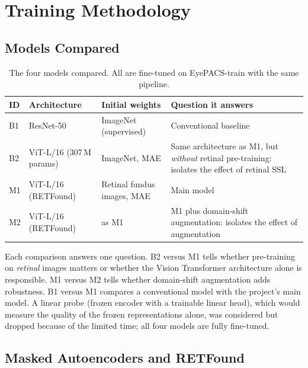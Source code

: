 \section{Training Methodology}
\label{sec:training_methodology}

\subsection{Models Compared}
\label{subsec:models}

\begin{table}[htbp]
    \centering
    \caption{The four models compared. All are fine-tuned on EyePACS-train with the same pipeline.}
    \label{tab:models}
    \begin{tabularx}{\textwidth}{l l l X}
        \toprule
        \textbf{ID} & \textbf{Architecture} & \textbf{Initial weights} & \textbf{Question it answers} \\
        \midrule
        B1 & ResNet-50                & ImageNet (supervised)           & Conventional baseline \\
        B2 & ViT-L/16 (307\,M params) & ImageNet, MAE                   & Same architecture as M1, but \emph{without} retinal pre-training: isolates the effect of retinal SSL \\
        M1 & ViT-L/16 (RETFound)      & Retinal fundus images, MAE      & Main model \\
        M2 & ViT-L/16 (RETFound)      & as M1                           & M1 plus domain-shift augmentation: isolates the effect of augmentation \\
        \bottomrule
    \end{tabularx}
\end{table}

Each comparison answers one question. B2 versus M1 tells whether pre-training on \emph{retinal} images matters or whether the Vision Transformer architecture alone is responsible. M1 versus M2 tells whether domain-shift augmentation adds robustness. B1 versus M1 compares a conventional model with the project's main model. A linear probe (frozen encoder with a trainable linear head), which would measure the quality of the frozen representations alone, was considered but dropped because of the limited time; all four models are fully fine-tuned.

\subsection{Masked Autoencoders and RETFound}
\label{subsec:mae}

